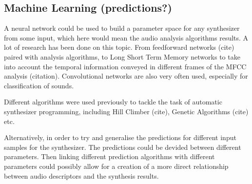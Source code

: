 \subsection{Machine Learning (predictions?)}

A neural network could be used to build a parameter space for any
synthesizer from some input, which here would mean the audio analysis
algorithms results. A lot of research has been done on this
topic. From feedforward networks (cite) paired with analysis
algorithms, to Long Short Term Memory networks to take into account
the temporal information conveyed in different frames of the MFCC
analysis (citation). Convolutional networks are also very often used,
especially for classification of sounds.

Different algorithms were used previously to tackle the task of
automatic synthesizer programming, including Hill Climber (cite),
Genetic Algorithms (cite) etc.

Alternatively, in order to try and generalise the predictions for
different input samples for the synthesizer. The predictions could be
devided between different parameters. Then linking different
prediction algorithms with different parameters could possibly allow
for a creation of a more direct relationship between audio descriptors
and the synthesis results. 




